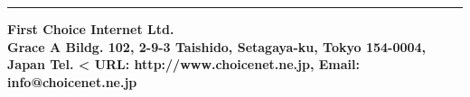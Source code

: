  	 \rule{\textwidth}{0.5pt} 
    \Large\bf First Choice Internet Ltd. \\ 
    \small
    Grace A Bildg. 102, 2-9-3 Taishido, Setagaya-ku, Tokyo 154-0004, Japan Tel. <%
    URL: http://www.choicenet.ne.jp, Email: info@choicenet.ne.jp